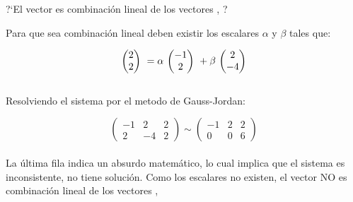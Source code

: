 
\begin{ejemplo}
?`El vector  es combinaci\'on lineal de los vectores 
, ?
\end{ejemplo}


Para que sea combinación lineal deben existir los escalares
$\alpha$ y $\beta$ tales que:

\[\mbox{ \ensuremath{\begin{pmatrix} 2\\ 2\\ \end{pmatrix} } }=\alpha\mbox{ \ensuremath{\begin{pmatrix} -1\\ 2\\ \end{pmatrix} } }+
\beta\mbox{ \ensuremath{\begin{pmatrix} 2\\ -4\\ \end{pmatrix} } }\]
~\\
Resolviendo el sistema por el metodo de Gauss-Jordan:

\[
\left(
\begin{array}{rr|r}
-1 & 2 & 2\\
2&-4&2
\end{array}
\right)
\sim
\left(
\begin{array}{rr|r}
-1 & 2 & 2\\
0&0&6
\end{array}
\right)
\]
~\\
La \'ultima fila indica un absurdo matem\'atico, lo cual implica que el sistema es inconsistente, no
tiene soluci\'on. Como los escalares no existen, el vector  NO es combinaci\'on lineal de los vectores 
, 

\newpage
%
%
%
%
%
%
%
%

